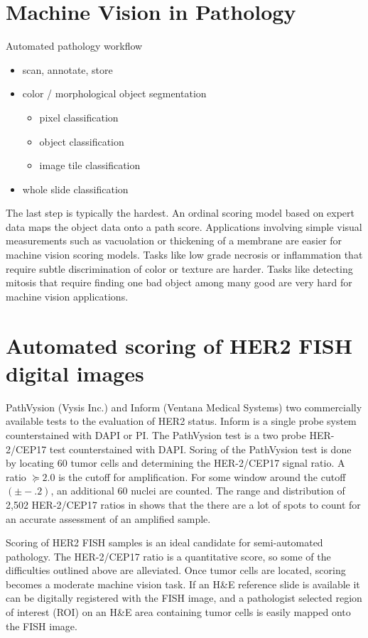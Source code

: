 \documentclass[10pt]{amsart}
\theoremstyle{definition}
\theoremstyle{remark}
\numberwithin{equation}{section}
\begin{document}
\section{Machine Vision in Pathology}
Automated pathology workflow
\begin{itemize}
    \item scan, annotate, store
    \item color / morphological object segmentation
    \begin{itemize}
\item pixel classification \item object classification \item image
tile classification
\end{itemize}
    \item whole slide classification
\end{itemize}
The last step is typically the hardest.  An ordinal scoring model
based on expert data maps the object data onto a path score.
Applications involving simple visual measurements such as
vacuolation or thickening of a membrane are easier for machine
vision scoring models.  Tasks like low grade necrosis or
inflammation that require subtle discrimination of color or
texture are harder. Tasks like detecting mitosis that require
finding one bad object among many good are very hard for machine
vision applications.

\section{Automated scoring of HER2 FISH digital images}
PathVysion (Vysis Inc.) and Inform (Ventana Medical Systems) two
commercially available tests to the evaluation of HER2 status.
Inform is a single probe system counterstained with DAPI or PI.
The PathVysion test is a two probe HER-2/CEP17 test counterstained
with DAPI.  Soring of the PathVysion test is done by locating 60
tumor cells and determining the HER-2/CEP17 signal ratio.  A ratio
$\succeq 2.0$ is the cutoff for amplification. For some window
around the cutoff $( \pm -.2 )$, an additional 60 nuclei are
counted. The range and distribution of 2,502 HER-2/CEP17 ratios in
\cite{3} shows that the there are a lot of spots to count for an
accurate assessment of an amplified sample.

Scoring of HER2 FISH samples is an ideal candidate for
semi-automated pathology.  The HER-2/CEP17 ratio is a quantitative
score, so some of the difficulties outlined above are alleviated.
Once tumor cells are located, scoring becomes a moderate machine
vision task. If an H\&E reference slide is available it can be
digitally registered with the FISH image, and  a pathologist
selected region of interest (ROI) on an H\&E area containing tumor
cells is easily mapped onto the FISH image.
\end{document}
